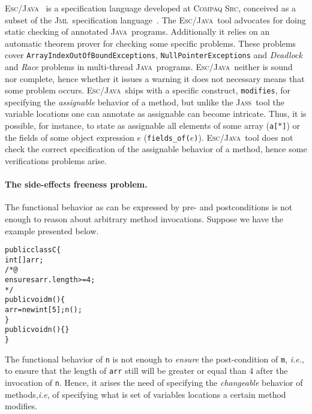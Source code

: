 \documentclass[a4paper]{llncs}
\newcommand{\jml}{\textsc{Jml}}
\newcommand{\escj}{\textsc{Esc/Java}}
\newcommand{\jass}{\textsc{Jass}}
\newcommand{\java}{\textsc{Java}}
\newcommand{\eiff}{\textsc{Eiffel}}
\newcommand{\csrc}{\textsc{Compaq Src}}
\begin{document}
\escj~\cite{ESCJavaUrl} is a specification language developed at
\csrc, conceived as a subset of the \jml~specification
language~\cite{EscJmlDiff}. The \escj~tool advocates for doing static
checking of annotated \java~programs. Additionally it relies on an
automatic theorem prover for checking some specific problems. These
problems cover \texttt{ArrayIndexOutOfBoundExceptions},
\texttt{NullPointerExceptions} and \emph{Deadlock} and \emph{Race}
problems in multi-thread \java~programs. \escj~neither is sound nor
complete, hence whether it issues a warning it does not necessary
means that some problem occurs. \escj~ships with a specific construct,
\texttt{modifies}, for specifying the \emph{assignable} behavior of a
method, but unlike the \jass~tool the variable locations one can
annotate as assignable can become intricate. Thus, it is possible,
for instance, to state as assignable all elements of some array
(\texttt{a[$*$]}) or the fields of some object
expression $e$ (\texttt{fields\_of($e$)}). \escj~tool does not check
the correct specification of the assignable behavior of a method,
hence some verifications problems arise.



\paragraph{\bf The side-effects freeness problem.}
The functional behavior as can be expressed by pre- and postconditions
is not enough to reason about arbitrary method invocations. Suppose we 
have the example presented below. 
\begin{alltt}
public class C\verb!{!
  int[] arr;
  /*@
    ensures arr.length >= 4;
   */
  public void m()\verb!{!
    arr = new int[5]; n();
  \verb!}!
  public void n()\verb!{}!
\verb!}!
\end{alltt}
The functional behavior of \texttt{n} is not enough to \emph{ensure}
the post-condition of \texttt{m}, \emph{i.e.}, to ensure that the
length of \texttt{arr} still will be greater or equal than $4$ after
the invocation of \texttt{n}. Hence, it arises the need of specifying
the \emph{changeable} behavior of methods,\emph{i.e}, of specifying what
is set of variables locations a certain method modifies.
\end{document}
